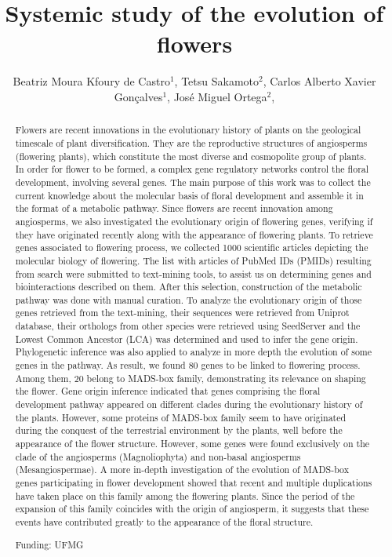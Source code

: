 \documentclass[twoside]{article}
\title{\vspace{-15mm}\fontsize{24pt}{10pt}\selectfont\textbf{ Systemic study of the evolution of flowers }} %
\author{ Beatriz Moura Kfoury de Castro$^{1}$, Tetsu Sakamoto$^{2}$, Carlos Alberto Xavier Gonçalves$^{1}$, José Miguel Ortega$^{2}$, }
\affil{ 1 UFMG

2 Universidade Federal de Minas Gerais, Laboratório de Biodados

 }
\date{}
\begin{document}
  
  
  \maketitle %
  
  
  \thispagestyle{fancy} %
  
  
  \begin{abstract}
  Flowers are recent innovations in the evolutionary history of plants on the geological timescale of plant diversification. They are the reproductive structures of angiosperms (flowering plants), which constitute the most diverse and cosmopolite group of plants. In order for flower to be formed, a complex gene regulatory networks control the floral development, involving several genes. The main purpose of this work was to collect the current knowledge about the molecular basis of floral development and assemble it in the format of a metabolic pathway. Since flowers are recent innovation among angiosperms, we also investigated the evolutionary origin of flowering genes, verifying if they have originated recently along with the appearance of flowering plants. To retrieve genes associated to flowering process, we collected 1000 scientific articles depicting the molecular biology of flowering. The list with articles of PubMed IDs (PMIDs) resulting from search were submitted to text-mining tools, to assist us on determining genes and biointeractions described on them. After this selection, construction of the metabolic pathway was done with manual curation. To analyze the evolutionary origin of those genes retrieved from the text-mining, their sequences were retrieved from Uniprot database, their orthologs from other species were retrieved using SeedServer and the Lowest Common Ancestor (LCA) was determined and used to infer the gene origin. Phylogenetic inference was also applied to analyze in more depth the evolution of some genes in the pathway. As result, we found 80 genes to be linked to flowering process. Among them, 20 belong to MADS-box family, demonstrating its relevance on shaping the flower. Gene origin inference indicated that genes comprising the floral development pathway appeared on different clades during the evolutionary history of the plants. However, some proteins of MADS-box family seem to have originated during the conquest of the terrestrial environment by the plants, well before the appearance of the flower structure. However, some genes were found exclusively on the clade of the angiosperms (Magnoliophyta) and non-basal angiosperms (Mesangiospermae). A more in-depth investigation of the evolution of MADS-box genes participating in flower development showed that recent and multiple duplications have taken place on this family among the flowering plants. Since the period of the expansion of this family coincides with the origin of angiosperm, it suggests that these events have contributed greatly to the appearance of the floral structure.
  
  Funding: UFMG \\ 
  \end{abstract}
  
\end{document}

